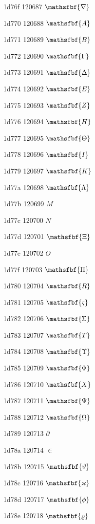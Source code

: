 \documentclass[11pt]{article}
\begin{document}
1d76f 120687 \ensuremath{\mathsfbf{\nabla}}

1d770 120688 \ensuremath{\mathsfbf{{A}}}

1d771 120689 \ensuremath{\mathsfbf{{B}}}

1d772 120690 \ensuremath{\mathsfbf{\Gamma}}

1d773 120691 \ensuremath{\mathsfbf{\Delta}}

1d774 120692 \ensuremath{\mathsfbf{{E}}}

1d775 120693 \ensuremath{\mathsfbf{{Z}}}

1d776 120694 \ensuremath{\mathsfbf{{H}}}

1d777 120695 \ensuremath{\mathsfbf{\Theta}}

1d778 120696 \ensuremath{\mathsfbf{{I}}}

1d779 120697 \ensuremath{\mathsfbf{{K}}}

1d77a 120698 \ensuremath{\mathsfbf{\Lambda}}

1d77b 120699 \ensuremath{M}

1d77c 120700 \ensuremath{N}

1d77d 120701 \ensuremath{\mathsfbf{\Xi}}

1d77e 120702 \ensuremath{O}

1d77f 120703 \ensuremath{\mathsfbf{\Pi}}

1d780 120704 \ensuremath{\mathsfbf{{R}}}

1d781 120705 \ensuremath{\mathsfbf{\varsigma}}

1d782 120706 \ensuremath{\mathsfbf{\Sigma}}

1d783 120707 \ensuremath{\mathsfbf{{T}}}

1d784 120708 \ensuremath{\mathsfbf{\Upsilon}}

1d785 120709 \ensuremath{\mathsfbf{\Phi}}

1d786 120710 \ensuremath{\mathsfbf{{X}}}

1d787 120711 \ensuremath{\mathsfbf{\Psi}}

1d788 120712 \ensuremath{\mathsfbf{\Omega}}

1d789 120713 \ensuremath{\partial}

1d78a 120714 \ensuremath{\in}

1d78b 120715 \ensuremath{\mathsfbf{\vartheta}}

1d78c 120716 \ensuremath{\mathsfbf{\varkappa}}

1d78d 120717 \ensuremath{\mathsfbf{\phi}}

1d78e 120718 \ensuremath{\mathsfbf{\varrho}}
\end{document}
